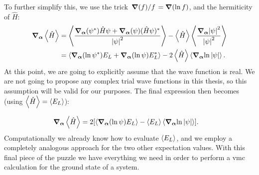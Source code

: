 \documentclass[Thesis.tex]{subfiles}
\begin{document}
To further simplify this, we use the trick $\flatfrac{\grad(f)}{f}=\grad(\ln
f)$, and the hermiticity of $\hat H$:
\begin{align}
    \grad_{\bm{\alpha}}\expval{\hat H}
    &= \expval{\frac{\grad_{\bm{\alpha}}(\psi^*)\hat H\psi + \grad_{\bm{\alpha}}(\psi)(\hat H\psi)^*}{\abs{\psi}^2}}
    - \expval{\hat H}\expval{\frac{\grad_{\bm{\alpha}}\abs{\psi}^2}{\abs{\psi}^2}}\\
    &= \expval{\grad_{\bm{\alpha}}(\ln \psi^*) E_L + \grad_{\bm{\alpha}}(\ln\psi)E_L^*}
    - 2\expval{\hat H}\expval{\grad_{\bm{\alpha}}{\ln\abs{\psi}}}.
\end{align}
At this point, we are going to explicitly assume that the wave function is
real. We are not going to propose any complex trial wave functions in this
thesis, so this assumption will be valid for our purposes. The final expression then becomes (using $\expval{\hat H}=\expval{E_L}$):

\begin{align}
    \grad_{\bm{\alpha}}\expval{\hat H}
    &= 2\qty[\expval{\grad_{\bm{\alpha}}(\ln \psi) E_L}
    - \expval{E_L}\expval{\grad_{\bm{\alpha}}{\ln\abs{\psi}}}].
    \label{eq:local-energy-gradient-alpha}
\end{align}
Computationally we already know how to evaluate $\expval{E_L}$, and we employ a completely analogous approach for the two other expectation values.
With this final piece of the puzzle we have everything we need in order to perform a \gls{vmc} calculation for the ground state of a system.
\end{document}
